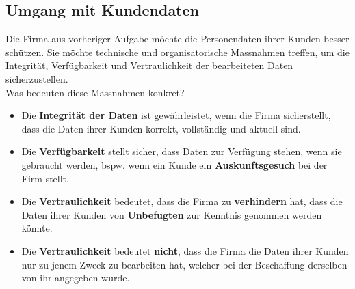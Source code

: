 \subsection{Umgang mit Kundendaten}
Die Firma aus vorheriger Aufgabe möchte die Personendaten ihrer Kunden besser schützen. Sie möchte technische und organisatorische Massnahmen treffen, um die Integrität, Verfügbarkeit und Vertraulichkeit der bearbeiteten Daten sicherzustellen.\\
Was bedeuten diese Massnahmen konkret?
\begin{itemize}
	\item Die \textbf{Integrität der Daten} ist gewährleistet, wenn die Firma sicherstellt, dass die Daten ihrer Kunden korrekt, vollständig und aktuell sind.
	\item Die \textbf{Verfügbarkeit} stellt sicher, dass Daten zur Verfügung stehen, wenn sie gebraucht werden, bspw. wenn ein Kunde ein \textbf{Auskunftsgesuch} bei der Firm stellt.
	\item Die \textbf{Vertraulichkeit} bedeutet, dass die Firma zu \textbf{verhindern} hat, dass die Daten ihrer Kunden von \textbf{Unbefugten} zur Kenntnis genommen werden könnte.
	\item Die \textbf{Vertraulichkeit} bedeutet \textbf{nicht}, dass die Firma die Daten ihrer Kunden nur zu jenem Zweck zu bearbeiten hat, welcher bei der Beschaffung derselben von ihr angegeben wurde.
\end{itemize}

